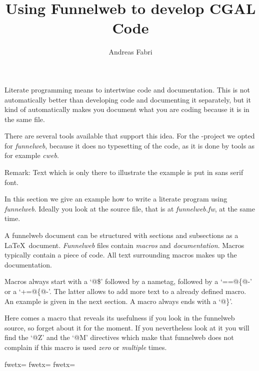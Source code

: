 \documentclass[]{article}
\begin{document}
\title{\bf Using Funnelweb to develop CGAL Code}
\author{Andreas Fabri}

\maketitle


Literate programming means to intertwine code and documentation.
This is not automatically better than developing code and documenting it
separately, but it kind of automatically makes you document
what you are coding because it is in the same file.

There are several tools available that support this idea. For the
\cgal -project we opted for {\em funnelweb}, because it does no
typesetting of the code, as it is done by tools as for example {\em cweb}.

\smallskip
\noindent Remark: Text which is only there to illustrate the example
is put in {\sf sans serif} font.


In this section we give an example how to write a literate program
using {\em funnelweb}. Ideally you look at the source file, that is
at {\it funnelweb.fw}, at the same time.

A funnelweb document can be structured with sections and subsections
as a \LaTeX\ document. {\it Funnelweb} files contain {\em macros} and
{\em documentation}. Macros typically contain a piece of code. All
text surrounding macros makes up the documentation.




Macros always start with a `@\$' followed by a nametag,
followed by a `==@\{@-' or a `+=@\{@-'. The latter allows to add more text
to a already defined macro. An example is given in the next section.
A macro always ends with a `@\}'.

Here comes a macro that  reveals its usefulness if you look in the
funnelweb source, so forget about it for the moment. If you nevertheless
look at it you will find the `@Z' and the `@M' directives which
make that funnelweb does not complain if this macro is used {\em zero}
or {\em multiple} times.


\fwbeginmacro
{}\fwzero{}\fwmany{}\fwequals \fwodef \fwbtx[#line ]fwetx=%
\fwbtx[ "]fwetx=%
\fwbtx["]fwetx=%
\fwcdef 
\fwbeginmacronotes
{}
\fwendmacronotes
\fwendmacro
\end{document}
